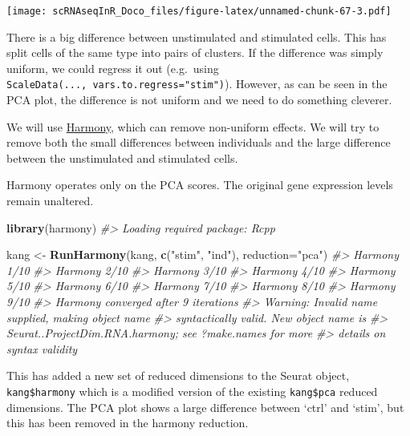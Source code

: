 \documentclass[
]{book}
\newenvironment{Shaded}{\begin{snugshade}}{\end{snugshade}}
\newcommand{\AttributeTok}[1]{\textcolor[rgb]{0.13,0.29,0.53}{#1}}
\newcommand{\CommentTok}[1]{\textcolor[rgb]{0.56,0.35,0.01}{\textit{#1}}}
\newcommand{\FunctionTok}[1]{\textcolor[rgb]{0.13,0.29,0.53}{\textbf{#1}}}
\newcommand{\NormalTok}[1]{#1}
\newcommand{\OtherTok}[1]{\textcolor[rgb]{0.56,0.35,0.01}{#1}}
\newcommand{\StringTok}[1]{\textcolor[rgb]{0.31,0.60,0.02}{#1}}
\begin{document}
\texttt{[image: scRNAseqInR\_Doco\_files/figure-latex/unnamed-chunk-67-3.pdf]}

There is a big difference between unstimulated and stimulated cells. This has split cells of the same type into pairs of clusters. If the difference was simply uniform, we could regress it out (e.g.~using \texttt{ScaleData(...,\ vars.to.regress="stim")}). However, as can be seen in the PCA plot, the difference is not uniform and we need to do something cleverer.

We will use \href{https://github.com/immunogenomics/harmony}{Harmony}, which can remove non-uniform effects. We will try to remove both the small differences between individuals and the large difference between the unstimulated and stimulated cells.

Harmony operates only on the PCA scores. The original gene expression levels remain unaltered.

\begin{Shaded}
\begin{Highlighting}[]
\FunctionTok{library}\NormalTok{(harmony)}
\CommentTok{\#\textgreater{} Loading required package: Rcpp}

\NormalTok{kang }\OtherTok{\textless{}{-}} \FunctionTok{RunHarmony}\NormalTok{(kang, }\FunctionTok{c}\NormalTok{(}\StringTok{"stim"}\NormalTok{, }\StringTok{"ind"}\NormalTok{), }\AttributeTok{reduction=}\StringTok{"pca"}\NormalTok{)}
\CommentTok{\#\textgreater{} Harmony 1/10}
\CommentTok{\#\textgreater{} Harmony 2/10}
\CommentTok{\#\textgreater{} Harmony 3/10}
\CommentTok{\#\textgreater{} Harmony 4/10}
\CommentTok{\#\textgreater{} Harmony 5/10}
\CommentTok{\#\textgreater{} Harmony 6/10}
\CommentTok{\#\textgreater{} Harmony 7/10}
\CommentTok{\#\textgreater{} Harmony 8/10}
\CommentTok{\#\textgreater{} Harmony 9/10}
\CommentTok{\#\textgreater{} Harmony converged after 9 iterations}
\CommentTok{\#\textgreater{} Warning: Invalid name supplied, making object name}
\CommentTok{\#\textgreater{} syntactically valid. New object name is}
\CommentTok{\#\textgreater{} Seurat..ProjectDim.RNA.harmony; see ?make.names for more}
\CommentTok{\#\textgreater{} details on syntax validity}
\end{Highlighting}
\end{Shaded}

This has added a new set of reduced dimensions to the Seurat object, \texttt{kang\$harmony} which is a modified version of the existing \texttt{kang\$pca} reduced dimensions. The PCA plot shows a large difference between `ctrl' and `stim', but this has been removed in the harmony reduction.
\end{document}
